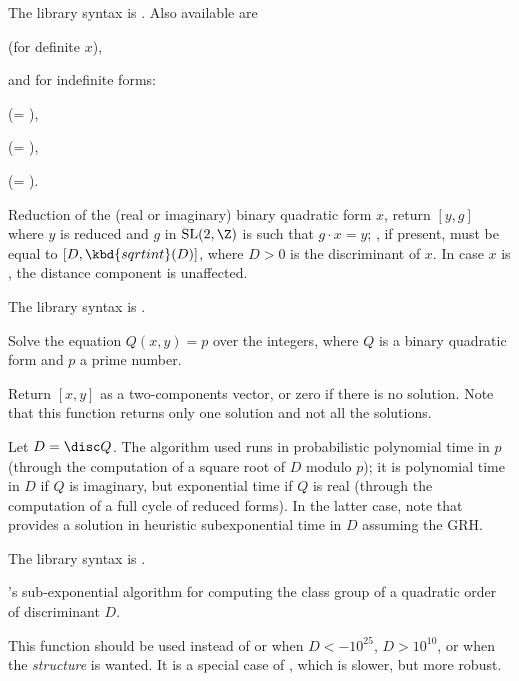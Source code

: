 The library syntax is .
Also available are

 (for definite $x$),

\noindent and for indefinite forms:


 (= ),

 (= ),

 (= ).

\label{se:qfbredsl2}
Reduction of the (real or imaginary) binary quadratic form $x$, return
$[y,g]$ where $y$ is reduced and $g$ in $\text{SL}(2,\Z)$ is such that
 $g \cdot x = y$; , if
present, must be equal to $[D, \kbd{sqrtint}(D)]$, where $D > 0$ is the
discriminant of $x$. In case $x$ is , the distance component is
unaffected.

The library syntax is .

\label{se:qfbsolve}
Solve the equation $Q(x,y)=p$ over the integers,
where $Q$ is a binary quadratic form and $p$ a prime number.

Return $[x,y]$ as a two-components vector, or zero if there is no solution.
Note that this function returns only one solution and not all the solutions.

Let $D = \disc Q$. The algorithm used runs in probabilistic polynomial time
in $p$ (through the computation of a square root of $D$ modulo $p$); it is
polynomial time in $D$ if $Q$ is imaginary, but exponential time if $Q$ is
real (through the computation of a full cycle of reduced forms). In the
latter case, note that  provides a solution in heuristic
subexponential time in $D$ assuming the GRH.

The library syntax is .

\label{se:quadclassunit}
's sub-exponential algorithm for computing the
class group of a quadratic order of discriminant $D$.

This function should be used instead of  or 
when $D<-10^{25}$, $D>10^{10}$, or when the \emph{structure} is wanted. It
is a special case of , which is slower, but more robust.

